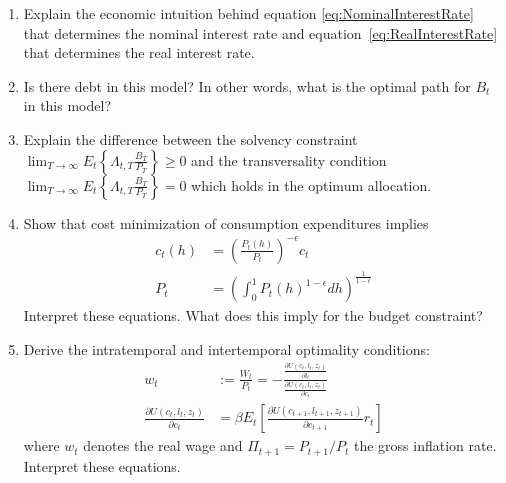 \begin{enumerate}
\item Explain the economic intuition behind equation \eqref{eq:NominalInterestRate} that determines the nominal interest rate
  and equation~\eqref{eq:RealInterestRate} that determines the real interest rate.

\item Is there debt in this model? In other words, what is the optimal path for \(B_t\) in this model?

\item Explain the difference between the solvency constraint \( \lim_{T \rightarrow \infty} E_t {\left \{ \Lambda_{t,T} \frac{B_T}{P_T} \right \}} \geq 0 \)
and the transversality condition \(\lim_{T \rightarrow \infty} E_t \left \{ \Lambda_{t,T} \frac{B_T}{P_T} \right \} = 0\) which holds in the optimum allocation.

\item Show that cost minimization of consumption expenditures implies
\begin{align*}
c_t(h) &= {\left(\frac{P_t(h)}{P_t}\right)}^{-\epsilon} c_t
\\
P_t &= {\left(\int_0^1 P_t(h)^{1-\epsilon}dh\right)}^{\frac{1}{1-\epsilon}}
\end{align*}
Interpret these equations. What does this imply for the budget constraint?

\item Derive the intratemporal and intertemporal optimality conditions:
\begin{align*}
w_t &:= \frac{W_t}{P_t} = - \frac{\frac{\partial U(c_t,l_t,z_t)}{\partial l_t}}{\frac{\partial U(c_t,l_t,z_t)}{\partial c_t}}
\\
\frac{\partial U(c_t,l_t,z_t)}{\partial c_t} &= \beta E_t \left[\frac{\partial U(c_{t+1},l_{t+1},z_{t+1})}{\partial c_{t+1}} r_t \right]
\end{align*}
where \(w_t\) denotes the real wage and \(\Pi_{t+1} = P_{t+1}/P_t\) the gross inflation rate. Interpret these equations.
\end{enumerate}


